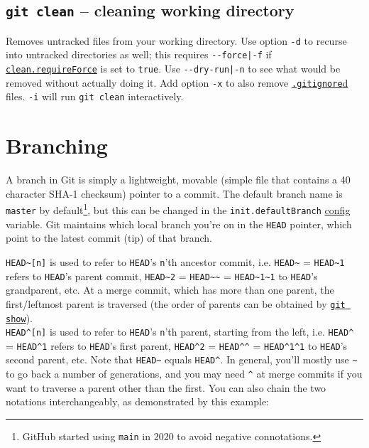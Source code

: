 \documentclass[8pt, table, xcdraw]{article}%
\begin{document}
\subsection{\lstinline{git clean} -- cleaning working directory} \label{clean}

Removes untracked files from your working directory. Use option \lstinline{-d} to recurse into untracked directories as well; this requires \lstinline{--force|-f} if \hyperref[config]{\lstinline{clean.requireForce}} is set to \lstinline{true}. Use \lstinline{--dry-run|-n} to see what would be removed without actually doing it. Add option \lstinline{-x} to also remove \hyperref[gitignore]{\lstinline{.gitignore}d} files. \lstinline{-i} will run \lstinline{git clean} interactively.

\section{Branching} \label{branching}

A branch in Git is simply a lightweight, movable (simple file that contains a 40 character SHA-1 checksum) pointer to a commit. The default branch name is \lstinline{master} by default\footnote{GitHub started using \lstinline{main} in 2020 to avoid negative connotations.}, but this can be changed in the \lstinline{init.defaultBranch} \hyperref[config]{config} variable. Git maintains which local branch you're on in the \lstinline{HEAD} pointer, which point to the latest commit (tip) of that branch.

\lstinline{HEAD~[n]} is used to refer to \lstinline{HEAD}'s \lstinline{n}'th ancestor commit, i.e. \lstinline{HEAD~} = \lstinline{HEAD~1} refers to \lstinline{HEAD}'s parent commit, \lstinline{HEAD~2} = \lstinline{HEAD~~} = \lstinline{HEAD~1~1} to \lstinline{HEAD}'s grandparent, etc. At a merge commit, which has more than one parent, the first/leftmost parent is traversed (the order of parents can be obtained by \hyperref[show]{\lstinline{git show}}).\\
\lstinline{HEAD^[n]} is used to refer to \lstinline{HEAD}'s \lstinline{n}'th parent, starting from the left, i.e. \lstinline{HEAD^} = \lstinline{HEAD^1} refers to \lstinline{HEAD}'s first parent, \lstinline{HEAD^2} = \lstinline{HEAD^^} = \lstinline{HEAD^1^1} to \lstinline{HEAD}'s second parent, etc. Note that \lstinline{HEAD~} equals \lstinline{HEAD^}. In general, you'll mostly use \lstinline{~} to go back a number of generations, and you may need \lstinline{^} at merge commits if you want to traverse a parent other than the first. You can also chain the two notations interchangeably, as demonstrated by this example:
\end{document}
